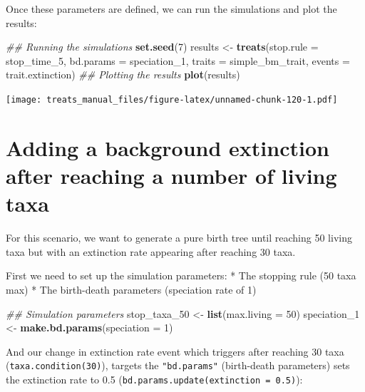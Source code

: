 \documentclass[
]{book}
\newenvironment{Shaded}{\begin{snugshade}}{\end{snugshade}}
\newcommand{\CommentTok}[1]{\textcolor[rgb]{0.56,0.35,0.01}{\textit{#1}}}
\newcommand{\DataTypeTok}[1]{\textcolor[rgb]{0.13,0.29,0.53}{#1}}
\newcommand{\DecValTok}[1]{\textcolor[rgb]{0.00,0.00,0.81}{#1}}
\newcommand{\KeywordTok}[1]{\textcolor[rgb]{0.13,0.29,0.53}{\textbf{#1}}}
\newcommand{\NormalTok}[1]{#1}
\newcommand{\StringTok}[1]{\textcolor[rgb]{0.31,0.60,0.02}{#1}}
\begin{document}
Once these parameters are defined, we can run the simulations and plot the results:

\begin{Shaded}
\begin{Highlighting}[]
\CommentTok{\#\# Running the simulations}
\KeywordTok{set.seed}\NormalTok{(}\DecValTok{7}\NormalTok{)}
\NormalTok{results \textless{}{-}}\StringTok{ }\KeywordTok{treats}\NormalTok{(}\DataTypeTok{stop.rule =}\NormalTok{ stop\_time\_}\DecValTok{5}\NormalTok{,}
                \DataTypeTok{bd.params =}\NormalTok{ speciation\_}\DecValTok{1}\NormalTok{,}
                \DataTypeTok{traits    =}\NormalTok{ simple\_bm\_trait,}
                \DataTypeTok{events    =}\NormalTok{ trait.extinction)}
\CommentTok{\#\# Plotting the results}
\KeywordTok{plot}\NormalTok{(results)}
\end{Highlighting}
\end{Shaded}

\texttt{[image: treats\_manual\_files/figure-latex/unnamed-chunk-120-1.pdf]}

\hypertarget{EGbg_ext}{%
\section{Adding a background extinction after reaching a number of living taxa}\label{EGbg_ext}}

For this scenario, we want to generate a pure birth tree until reaching 50 living taxa but with an extinction rate appearing after reaching 30 taxa.

First we need to set up the simulation parameters:
* The stopping rule (50 taxa max)
* The birth-death parameters (speciation rate of 1)

\begin{Shaded}
\begin{Highlighting}[]
\CommentTok{\#\# Simulation parameters}
\NormalTok{stop\_taxa\_}\DecValTok{50}\NormalTok{ \textless{}{-}}\StringTok{ }\KeywordTok{list}\NormalTok{(}\DataTypeTok{max.living =} \DecValTok{50}\NormalTok{)}
\NormalTok{speciation\_}\DecValTok{1}\NormalTok{ \textless{}{-}}\StringTok{ }\KeywordTok{make.bd.params}\NormalTok{(}\DataTypeTok{speciation =} \DecValTok{1}\NormalTok{)}
\end{Highlighting}
\end{Shaded}

And our change in extinction rate event which triggers after reaching 30 taxa (\texttt{taxa.condition(30)}), targets the \texttt{"bd.params"} (birth-death parameters) sets the extinction rate to 0.5 (\texttt{bd.params.update(extinction\ =\ 0.5)}):
\end{document}
